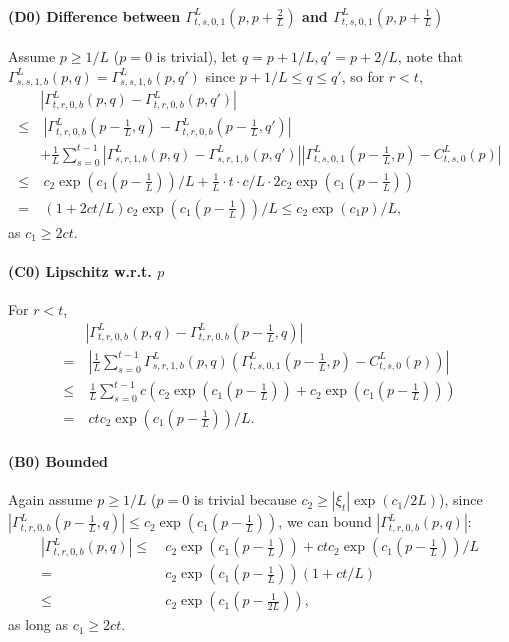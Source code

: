 \documentclass{article}
\theoremstyle{plain}
\theoremstyle{definition}
\begin{document}
\paragraph{(D0) Difference between $\Gamma^L_{t,s,0,1}(p,p+\frac2L)$ and $\Gamma^L_{t,s,0,1}(p,p+\frac1L)$ }

Assume $p\geq 1/L$ ($p=0$ is trivial), 
let $q=p+1/L, q'=p+2/L$, note that $\Gamma_{s,s,1,b}^L(p,q)=\Gamma_{s,s,1,b}^L(p,q')$ since $p+1/L\leq q\leq q'$, so for $r < t$, 
\begin{align*}
    & |\Gamma^L_{t,r,0,b}\left(p, q\right) - \Gamma^L_{t,r,0,b}\left(p, q'\right)|\\
    \leq &~|\Gamma^L_{t,r,0,b}\left(p-\frac1L, q\right) -\Gamma^L_{t,r,0,b}\left(p-\frac1L, q'\right)|  \\
     & + \frac1L \sum_{s=0}^{t-1} |\Gamma^L_{s,r,1,b}\left(p, q\right)-\Gamma^L_{s,r,1,b}\left(p, q'\right)|\left|\Gamma^L_{t,s,0,1}\left(p-\frac1L, p\right)-C^L_{t,s,0}\left(p\right)\right|\\
    \leq &~ c_2\exp(c_1(p-\frac1L)) / L + \frac1L \cdot t \cdot c/L \cdot 2c_2\exp(c_1(p-\frac1L)) \\
    = &~ (1 + 2ct/L) c_2\exp(c_1(p-\frac1L)) /L \leq c_2\exp(c_1p) /L,
\end{align*}
as $c_1\geq 2ct$.

\paragraph{(C0) Lipschitz w.r.t. $p$ } For $r < t$, 
\begin{align*}
  & |\Gamma^{L}_{t,r,0,b}(p,q) - \Gamma^{L}_{t,r,0,b}(p-\frac1L,q)|\\
  = &~ |\frac1L \sum_{s=0}^{t-1} \Gamma^L_{s,r,1,b}\left(p, q\right)\left(\Gamma^L_{t,s,0,1}\left(p-\frac1L, p\right)-C^L_{t,s,0}\left(p\right)\right)|\\
  \leq &~ \frac1L  \sum_{s=0}^{t-1} c\left(c_2\exp(c_1(p-\frac1L))+c_2\exp(c_1(p-\frac1L))\right) \\
  = &~ ctc_2\exp(c_1(p-\frac1L))/L.
\end{align*}

\paragraph{(B0) Bounded} Again assume $p\geq 1/L$ ($p=0$ is trivial because $c_2\geq |\xi_t|\exp(c_1/2L)$), since $|\Gamma^{L}_{t,r,0,b}(p-\frac1L,q)|\leq c_2\exp(c_1(p-\frac1L))$,
we can bound $|\Gamma^{L}_{t,r,0,b}(p,q)|$:
\begin{align*}
    |\Gamma^{L}_{t,r,0,b}(p,q)|\leq&~ c_2\exp(c_1(p-\frac1L))+ ctc_2\exp(c_1(p-\frac1L))/L\\
    = &~ c_2\exp(c_1(p-\frac1L))(1+ct/L)\\
    \leq &~ c_2\exp(c_1(p-\frac{1}{2L})),
\end{align*}
as long as $c_1 \geq 2ct$.
\end{document}
